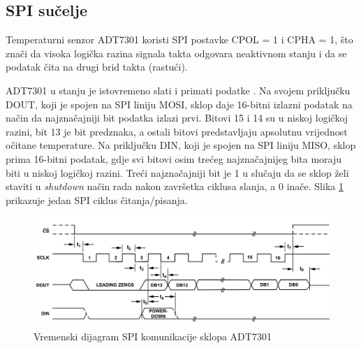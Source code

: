         \subsection{SPI sučelje}
            Temperaturni senzor ADT7301 koristi SPI postavke CPOL = 1 i CPHA = 1, što znači da visoka logička razina signala takta odgovara neaktivnom stanju i da se podatak čita na drugi brid takta (rastući).
            
            ADT7301 u stanju je istovremeno slati i primati podatke . Na svojem priključku DOUT, koji je spojen na SPI liniju MOSI, sklop daje 16-bitni izlazni podatak na način da najznačajniji bit podatka izlazi prvi. Bitovi 15 i 14 su u niskoj logičkoj razini, bit 13 je bit predznaka, a ostali bitovi predstavljaju apsolutnu vrijednost očitane temperature. Na priključku DIN, koji je spojen na SPI liniju MISO, sklop prima 16-bitni podatak, gdje svi bitovi osim trećeg najznačajnijeg bita moraju biti u niskoj logičkoj razini. Treći najznačajniji bit je 1 u slučaju da se sklop želi staviti u \textit{shutdown} način rada nakon završetka ciklusa slanja, a 0 inače. Slika \ref{fig:adt7301_spi} prikazuje jedan SPI ciklus čitanja/pisanja.
            
            \begin{figure}[htb]
                \centering
                \includegraphics[width=\textwidth]{slike/ADT7301_spi.png}
                \caption{Vremenski dijagram SPI komunikacije sklopa ADT7301 \cite{adt7301_datasheet}}
                \label{fig:adt7301_spi}
            \end{figure}
                